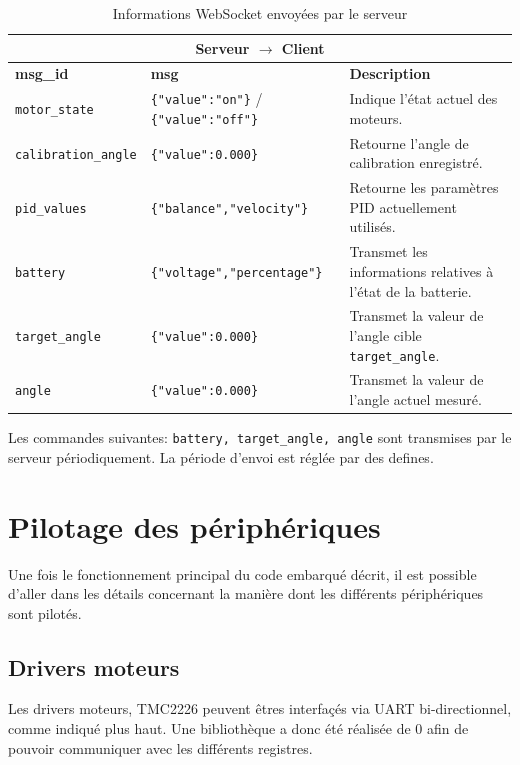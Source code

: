 \begin{table}[H]
\centering
\begin{tabularx}{\textwidth}{|l|X|X|}
\hline
\multicolumn{3}{|c|}{\textbf{Serveur $\rightarrow$ Client}} \\
\hline
\textbf{msg\_id} & \textbf{msg} & \textbf{Description} \\
\hline
\texttt{motor\_state} & \texttt{\{"value":"on"\}} / \texttt{\{"value":"off"\}} & Indique l'état actuel des moteurs. \\
\hline
\texttt{calibration\_angle} & \texttt{\{"value":0.000\}} & Retourne l'angle de calibration enregistré. \\
\hline
\texttt{pid\_values} & \texttt{\{"balance","velocity"\}} & Retourne les paramètres PID actuellement utilisés. \\
\hline
\texttt{battery} & \texttt{\{"voltage","percentage"\}} & Transmet les informations relatives à l'état de la batterie. \\
\hline
\texttt{target\_angle} & \texttt{\{"value":0.000\}} & Transmet la valeur de l'angle cible \texttt{target\_angle}. \\
\hline
\texttt{angle} & \texttt{\{"value":0.000\}} & Transmet la valeur de l'angle actuel mesuré. \\
\hline

\end{tabularx}
\caption{Informations WebSocket envoyées par le serveur}
\label{tab:websocket_server_client}
\end{table}

Les commandes suivantes: \texttt{battery, target\_angle, angle} sont transmises par le serveur périodiquement. La période d'envoi est réglée par des defines.
\section{Pilotage des périphériques}
Une fois le fonctionnement principal du code embarqué décrit, il est possible d'aller dans les détails concernant la manière dont les différents périphériques sont pilotés. 

\subsection{Drivers moteurs}
\label{subsection:drivers_moteurs}
Les drivers moteurs, TMC2226 \cite{TMC2226_datasheet} peuvent êtres interfaçés via UART bi-directionnel, comme indiqué plus haut. Une bibliothèque a donc été réalisée de 0 afin de pouvoir communiquer avec les différents registres.


